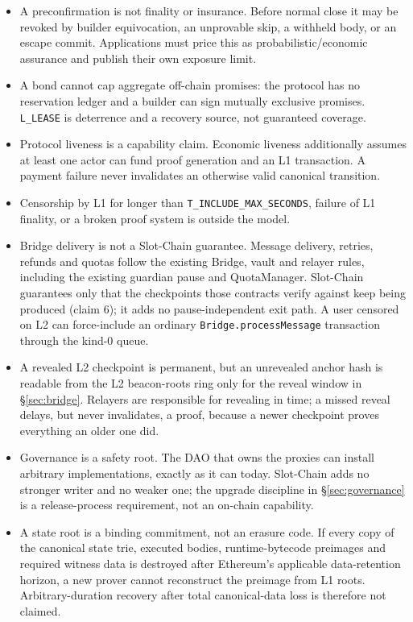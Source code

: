 \documentclass[a4paper,11pt]{article}
\newcommand{\code}[1]{\nolinkurl{#1}}
\begin{document}
\begin{itemize}
\item A preconfirmation is not finality or insurance.  Before normal close it
  may be revoked by builder equivocation, an unprovable skip, a withheld body,
  or an escape commit.  Applications must price this as probabilistic/economic
  assurance and publish their own exposure limit.
\item A bond cannot cap aggregate off-chain promises: the protocol has no
  reservation ledger and a builder can sign mutually exclusive promises.
  \code{L_LEASE} is deterrence and a recovery source, not guaranteed coverage.
\item Protocol liveness is a capability claim.  Economic liveness additionally
  assumes at least one actor can fund proof generation and an L1 transaction.
  A payment failure never invalidates an otherwise valid canonical transition.
\item Censorship by L1 for longer than \code{T_INCLUDE_MAX_SECONDS}, failure of L1
  finality, or a broken proof system is outside the model.
\item Bridge delivery is not a Slot-Chain guarantee.  Message delivery,
  retries, refunds and quotas follow the existing Bridge, vault and relayer
  rules, including the existing guardian pause and QuotaManager.  Slot-Chain
  guarantees only that the checkpoints those contracts verify against keep
  being produced (claim 6); it adds no pause-independent exit path.  A user
  censored on L2 can force-include an ordinary \code{Bridge.processMessage}
  transaction through the kind-0 queue.
\item A revealed L2 checkpoint is permanent, but an unrevealed anchor hash is
  readable from the L2 beacon-roots ring only for the reveal window in
  \S\ref{sec:bridge}.  Relayers are responsible for revealing in time; a
  missed reveal delays, but never invalidates, a proof, because a newer
  checkpoint proves everything an older one did.
\item Governance is a safety root.  The DAO that owns the proxies can install
  arbitrary implementations, exactly as it can today.  Slot-Chain adds no
  stronger writer and no weaker one; the upgrade discipline in
  \S\ref{sec:governance} is a release-process requirement, not an on-chain
  capability.
\item A state root is a binding commitment, not an erasure code.  If every copy
  of the canonical state trie, executed bodies, runtime-bytecode preimages and
  required witness data is
  destroyed after Ethereum's applicable data-retention horizon, a new prover
  cannot reconstruct the preimage from L1 roots.  Arbitrary-duration recovery
  after total canonical-data loss is therefore not claimed.
\end{itemize}
\end{document}
